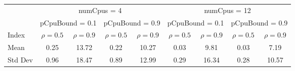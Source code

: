 \begin{tabular}{lc|c|c|c|c|c|c|c}
\toprule
& \multicolumn{4}{c|}{numCpus = 4} & \multicolumn{4}{c}{numCpus = 12} \\
& \multicolumn{2}{c|}{pCpuBound = 0.1} & \multicolumn{2}{c|}{pCpuBound = 0.9} & \multicolumn{2}{c|}{pCpuBound = 0.1} & \multicolumn{2}{c}{pCpuBound = 0.9} \\
Index & $\rho = 0.5$ & $\rho = 0.9$ & $\rho = 0.5$ & $\rho = 0.9$ & $\rho = 0.5$ & $\rho = 0.9$ & $\rho = 0.5$ & $\rho = 0.9$ \\
\midrule
Mean & 0.25 & 13.72 & 0.22 & 10.27 & 0.03 & 9.81 & 0.03 & 7.19 \\
\midrule
Std Dev & 0.96 & 18.47 & 0.89 & 12.99 & 0.29 & 16.34 & 0.28 & 10.57 \\
\bottomrule
\end{tabular}

